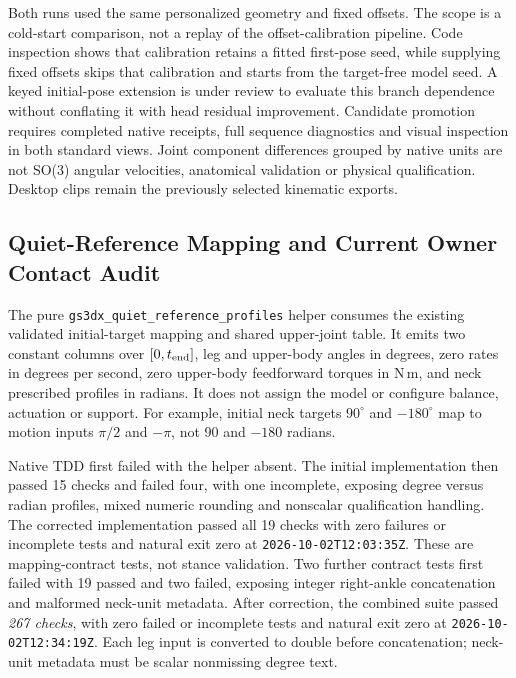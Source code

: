 \documentclass[11pt,a4paper]{article}
\begin{document}
Both runs used the same personalized geometry and fixed offsets. The scope
is a cold-start comparison, not a replay of the offset-calibration pipeline.
Code inspection shows that calibration retains a fitted first-pose seed,
while supplying fixed offsets skips that calibration and starts from the
target-free model seed. A keyed initial-pose extension is under review to
evaluate this branch dependence without conflating it with head residual
improvement. Candidate promotion requires completed native receipts, full
sequence diagnostics and visual inspection in both standard views. Joint
component differences grouped by native units are not SO(3) angular
velocities, anatomical validation or physical qualification. Desktop clips
remain the previously selected kinematic exports.

\subsection{Quiet-Reference Mapping and Current Owner Contact Audit}
The pure \texttt{gs3dx\_quiet\_reference\_profiles} helper consumes the
existing validated initial-target mapping and shared upper-joint table.
It emits two constant columns over $[0,t_{\rm end}]$, leg and upper-body
angles in degrees, zero rates in degrees per second, zero upper-body
feedforward torques in N\,m, and neck prescribed profiles in radians.
It does not assign the model or configure balance, actuation or support.
For example, initial neck targets $90^\circ$ and $-180^\circ$ map to
motion inputs $\pi/2$ and $-\pi$, not 90 and $-180$ radians.

Native TDD first failed with the helper absent. The initial implementation
then passed 15 checks and failed four, with one incomplete, exposing degree
versus radian profiles, mixed numeric rounding and nonscalar qualification
handling. The corrected implementation passed all 19 checks with zero
failures or incomplete tests and natural exit zero at
\texttt{2026-10-02T12:03:35Z}. These are mapping-contract tests, not stance
validation. Two further contract tests first failed with 19 passed and two failed,
exposing integer right-ankle concatenation and malformed neck-unit metadata.
After correction, the combined suite passed \emph{267 checks}, with zero
failed or incomplete tests and natural exit zero at
\texttt{2026-10-02T12:34:19Z}. Each leg input is converted to double before
concatenation; neck-unit metadata must be scalar nonmissing degree text.
\end{document}
